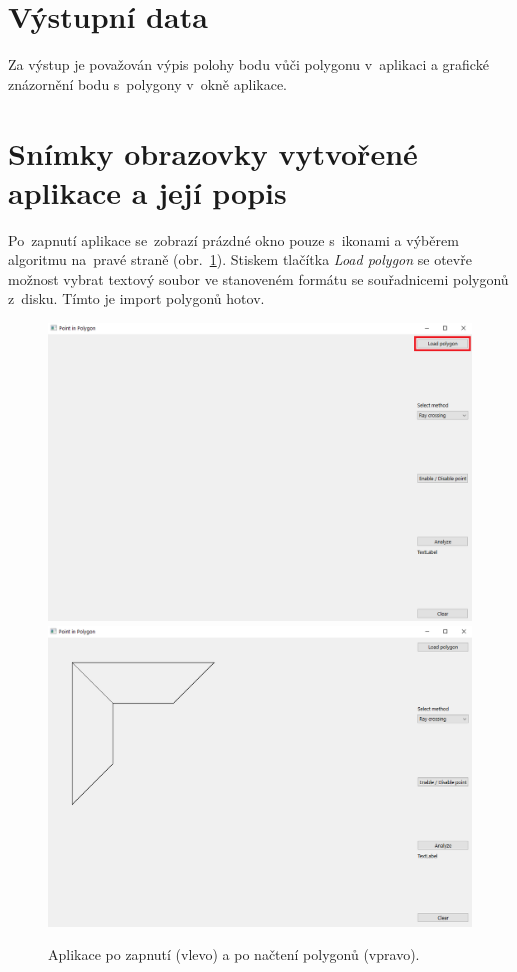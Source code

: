 \documentclass[a4paper, 12pt, oneside, titlepage]{article} %
\begin{document}
\section{Výstupní data}
Za výstup je považován výpis polohy bodu vůči polygonu v~aplikaci a grafické znázornění bodu s~polygony v~okně aplikace. 

\section{Snímky obrazovky vytvořené aplikace a její popis}
Po~zapnutí aplikace se~zobrazí prázdné okno pouze s~ikonami a výběrem algoritmu na~pravé straně (obr.~\ref{fig:app_zap_pol}). Stiskem tlačítka \emph{Load polygon} se otevře možnost vybrat textový soubor ve stanoveném formátu se souřadnicemi polygonů z~disku. Tímto je import polygonů hotov. 

\begin{figure}[htbh]
	\centering
	\includegraphics[scale=0.285]{obrazky/app_zapnuti.png}
	\includegraphics[scale=0.285]{obrazky/app_pol.png} 
	\caption{Aplikace po zapnutí (vlevo) a po načtení polygonů (vpravo).
	}
	\label{fig:app_zap_pol}
\end{figure} 
\FloatBarrier
\end{document}

